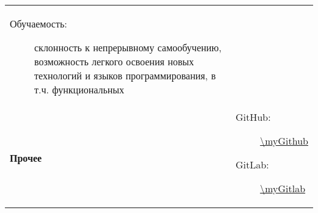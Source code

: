 \documentclass[../../main.tex]{subfiles}
\begin{document}
\begin{tabularx}{\textwidth}{>{\bfseries} p{3cm} X}
\begin{description}
                \item[Обучаемость:] склонность к непрерывному самообучению, возможность легкого освоения новых технологий и языков программирования, в т.ч. функциональных
            \end{description}\\
        Прочее &
            \begin{description}
                \item[GitHub:] \url{\myGithub}
                \item[GitLab:] \url{\myGitlab}
            \end{description}\\
    \end{tabularx}
\end{document}
